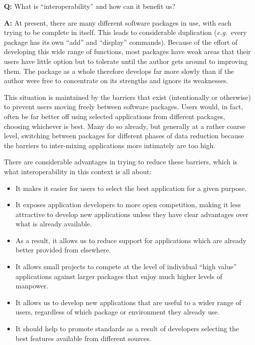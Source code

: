 \documentclass[twoside,11pt]{article}
\newcommand{\qt}[1]{``#1''}
\newcommand{\st}[1]{{\em{#1}}}
\newcommand{\qt}[1]{{\tt{"}}#1{\tt{"}}}
\begin{document}
{\Large \bf Q:} What is \qt{interoperability} and how can it benefit us?

{\Large \bf A:} At present, there are many different software packages
in use, with each trying to be complete in itself. This leads to
considerable duplication (\st{e.g.}\ every package has its own
\qt{add} and \qt{display} commands). Because of the effort of developing
this wide range of functions, most packages have weak areas that their
users have little option but to tolerate until the author gets around
to improving them.  The package as a whole therefore develops far more
slowly than if the author were free to concentrate on its strengths
and ignore its weaknesses.

This situation is maintained by the barriers that exist (intentionally
or otherwise) to prevent users moving freely between software
packages.  Users would, in fact, often be far better off using
selected applications from different packages, choosing whichever is
best.  Many do so already, but generally at a rather coarse level,
switching between packages for different phases of data reduction
because the barriers to inter-mixing applications more intimately are
too high.

There are considerable advantages in trying to reduce these barriers,
which is what interoperability in this context is all about:

\begin{itemize}
\item It makes it easier for users to select the best application for a given
purpose.

\item It exposes application developers to more open competition,
making it less attractive to develop new applications unless they have
clear advantages over what is already available.

\item As a result, it allows us to reduce support for applications which are
already better provided from elsewhere.

\item It allows small projects to compete at the level of individual
\qt{high value} applications against larger packages that enjoy much
higher levels of manpower.

\item It allows us to develop new applications that are useful to a wider
range of users, regardless of which package or environment they
already use.

\item It should help to promote standards as a result of developers
selecting the best features available from different sources.

\end{itemize}
\end{document}
